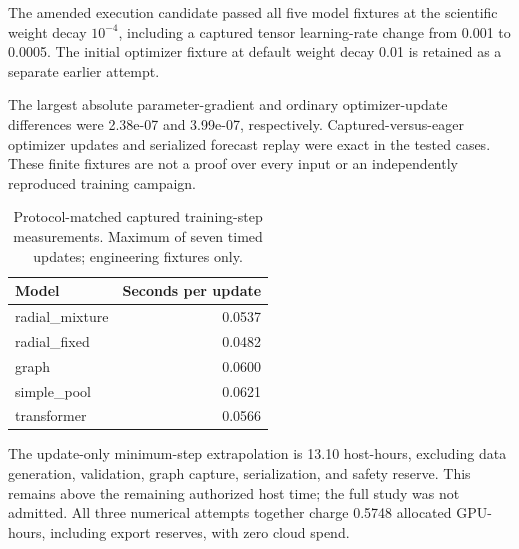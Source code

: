 The amended execution candidate passed all five model fixtures at the scientific weight decay $10^{-4}$, including a captured tensor learning-rate change from 0.001 to 0.0005. The initial optimizer fixture at default weight decay 0.01 is retained as a separate earlier attempt.

The largest absolute parameter-gradient and ordinary optimizer-update differences were 2.38e-07 and 3.99e-07, respectively. Captured-versus-eager optimizer updates and serialized forecast replay were exact in the tested cases. These finite fixtures are not a proof over every input or an independently reproduced training campaign.

\begin{table}[ht]\centering\small\caption{Protocol-matched captured training-step measurements. Maximum of seven timed updates; engineering fixtures only.}\begin{tabular}{lr}\toprule Model & Seconds per update\\\midrule
radial\_mixture & 0.0537\\
radial\_fixed & 0.0482\\
graph & 0.0600\\
simple\_pool & 0.0621\\
transformer & 0.0566\\
\bottomrule\end{tabular}\end{table}
The update-only minimum-step extrapolation is 13.10 host-hours, excluding data generation, validation, graph capture, serialization, and safety reserve. This remains above the remaining authorized host time; the full study was not admitted. All three numerical attempts together charge 0.5748 allocated GPU-hours, including export reserves, with zero cloud spend.
